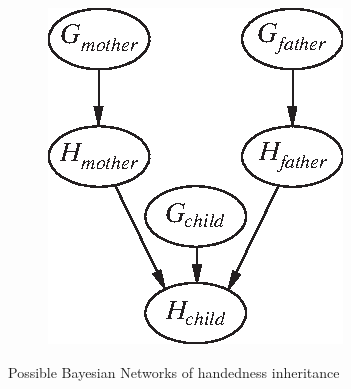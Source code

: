 \documentclass[9pt,a4paper]{extarticle}
\begin{document}
\begin{figure}
\begin{subfigure}{.3\linewidth}
\caption{}
\label{fig:sub1}
\end{subfigure}%
\begin{subfigure}{.3\linewidth}
\centering
\includegraphics[width=1.\textwidth]{figures/handedness3.eps}
\caption{}
\label{fig:sub1}
\end{subfigure}%
\caption{Possible Bayesian Networks of handedness inheritance}
\label{fig:b_net}
\end{figure}
\end{document}
